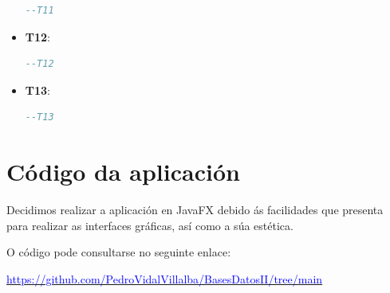 \documentclass[12pt,a4paper]{book}
\theoremstyle{definition}
\theoremstyle{break}
\begin{document}
\begin{itemize}
		\begin{lstlisting}[language=sql,style=sql,tabsize=5, escapechar={|},
			keywordstyle=\color{blue}\ttfamily,
			stringstyle=\color{red}\ttfamily]
			--T11
		\end{lstlisting}
		\item \textbf{T12}: 
		\begin{lstlisting}[language=sql,style=sql,tabsize=5, escapechar={|},
			keywordstyle=\color{blue}\ttfamily,
			stringstyle=\color{red}\ttfamily]
			--T12
		\end{lstlisting}
		\item \textbf{T13}: 
		\begin{lstlisting}[language=sql,style=sql,tabsize=5, escapechar={|},
			keywordstyle=\color{blue}\ttfamily,
			stringstyle=\color{red}\ttfamily]
			--T13
		\end{lstlisting}
	\end{itemize}


	\section{Código da aplicación}
	Decidimos realizar a aplicación en JavaFX debido ás facilidades que presenta para realizar as interfaces gráficas, así como a súa estética.
	
	O código pode consultarse no seguinte enlace: 
	
	\href{https://github.com/PedroVidalVillalba/BasesDatosII/tree/main}{\textcolor{blue}{https://github.com/PedroVidalVillalba/BasesDatosII/tree/main}}
	
	
	
	
	
\end{document}
